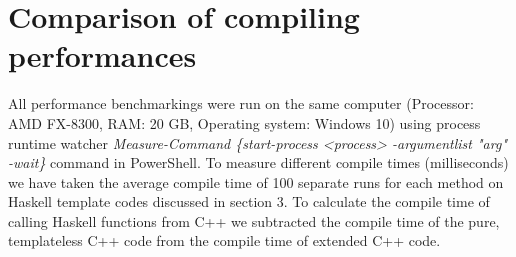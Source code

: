 \documentclass{article}
\begin{document}
\begin{comment}
\begin{lstlisting}[language=]

\end{lstlisting}
\centerline{\Bigg\Downarrow} \\
\begin{lstlisting}[language=]

\end{lstlisting}

\begin{lstlisting}[language=]

\end{lstlisting}
\centerline{\Bigg\Downarrow} \\
\begin{lstlisting}[language=]

\end{lstlisting}
\end{comment}
\section{Comparison of compiling performances}
All performance benchmarkings were run on the same computer (Processor: AMD FX-8300, RAM: 20 GB, Operating system: Windows 10) using process runtime watcher \textit{Measure-Command \{start-process <process> -argumentlist "arg" -wait\}} command in PowerShell.
To measure different compile times (milliseconds) we have taken the average compile time of 100 separate runs for each method on Haskell template codes discussed in section 3.
To calculate the compile time of calling Haskell functions from C++ we subtracted the compile time of the pure, templateless C++ code from the compile time of extended C++ code.
\begin{center}
\end{center}
\end{document}
